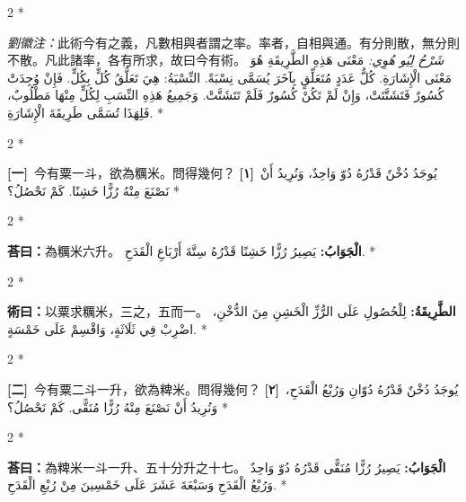 \documentclass[11pt,a4paper]{article}
\newcommand{\ar}[1]{\arabicfont\beginR #1\endR}
\newcommand{\problemnum}[1]{\textbf{[\ignorespaces#1\unskip]}}
\newenvironment{bilingual}{%
  \begin{paracol}{2}%
  \switchcolumn[0]*%
}{%
  \end{paracol}%
}
\newcommand{\cnline}[1]{\switchcolumn[0]\noindent #1 \switchcolumn[1]}
\newcommand{\arline}[1]{\noindent\ar{#1} \switchcolumn[0]*}
\newenvironment{prob bilingual}{%
  \begin{paracol}{2}%
  \switchcolumn[0]*%
}{%
  \end{paracol}%
  \vspace{0.3em}%
}
\begin{document}
\begin{bilingual}
\cnline{%
\textcolor{commentarycolor}{\small\textit{劉徽注：}}此術今有之義，凡數相與者謂之率。率者，自相與通。有分則散，無分則不散。凡此諸率，各有所求，故曰今有術。
}
\arline{%
\textcolor{commentarycolor}{\small\textit{شَرْحُ لِيُو هُوِي:}} مَعْنَى هَذِهِ الطَّرِيقَةِ هُوَ مَعْنَى الْإِشَارَةِ. كُلُّ عَدَدٍ مُتَعَلِّقٍ بِآخَرَ يُسَمَّى نِسْبَةً. النِّسْبَةُ: هِيَ تَعَلُّقُ كُلٍّ بِكُلٍّ. فَإِنْ وُجِدَتْ كُسُورٌ فَتَشَتَّتَتْ، وَإِنْ لَمْ تَكُنْ كُسُورٌ فَلَمْ تَتَشَتَّتْ. وَجَمِيعُ هَذِهِ النِّسَبِ لِكُلٍّ مِنْهَا مَطْلُوبٌ، فَلِهَذَا تُسَمَّى طَرِيقَةَ الْإِشَارَةِ.
}
\end{bilingual}

\vspace{0.5em}

\begin{bilingual}
\cnline{\problemnum{一}\, 今有粟一斗，欲為糲米。問得幾何？}
\arline{\problemnum{١}\, يُوجَدُ دُخْنٌ قَدْرُهُ دُوّ وَاحِدٌ، وَنُرِيدُ أَنْ نَصْنَعَ مِنْهُ رُزًّا خَشِنًا. كَمْ نَحْصُلُ؟}
\end{bilingual}

\begin{bilingual}
\cnline{\textcolor{answercolor}{\textbf{荅曰：}}為糲米六升。}
\arline{\textcolor{answercolor}{\textbf{الْجَوَابُ:}} يَصِيرُ رُزًّا خَشِنًا قَدْرُهُ سِتَّةَ أَرْبَاعِ الْقَدَحِ.}
\end{bilingual}

\begin{bilingual}
\cnline{%
\textcolor{methodcolor}{\textbf{術曰：}}以粟求糲米，三之，五而一。
}
\arline{%
\textcolor{methodcolor}{\textbf{الطَّرِيقَةُ:}} لِلْحُصُولِ عَلَى الرُّزِّ الْخَشِنِ مِنَ الدُّخْنِ، اضْرِبْ فِي ثَلَاثَةٍ، وَاقْسِمْ عَلَى خَمْسَةٍ.
}
\end{bilingual}

\begin{bilingual}
\cnline{\problemnum{二}\, 今有粟二斗一升，欲為粺米。問得幾何？}
\arline{\problemnum{٢}\, يُوجَدُ دُخْنٌ قَدْرُهُ دُوّانِ وَرُبْعُ الْقَدَحِ، وَنُرِيدُ أَنْ نَصْنَعَ مِنْهُ رُزًّا مُنَقًّى. كَمْ نَحْصُلُ؟}
\end{bilingual}

\begin{bilingual}
\cnline{\textcolor{answercolor}{\textbf{荅曰：}}為粺米一斗一升、五十分升之十七。}
\arline{\textcolor{answercolor}{\textbf{الْجَوَابُ:}} يَصِيرُ رُزًّا مُنَقًّى قَدْرُهُ دُوّ وَاحِدٌ وَرُبْعُ الْقَدَحِ وَسَبْعَةَ عَشَرَ عَلَى خَمْسِينَ مِنْ رُبْعِ الْقَدَحِ.}
\end{bilingual}
\end{document}
